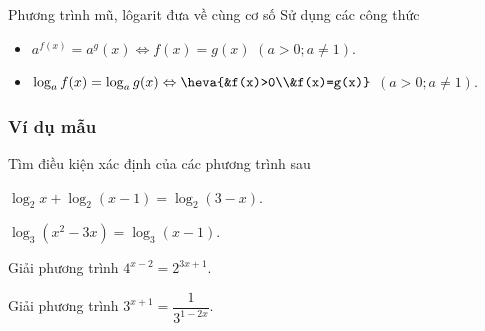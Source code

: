 \begin{dang}{Phương trình mũ, lôgarit đưa về cùng cơ số}
	Sử dụng các công thức
	\begin{itemize}
		\item $a^{f(x)}=a^g(x) \Leftrightarrow f(x)=g(x)$ $(a>0; a\neq 1)$.
		\item $\log_a f(x)=\log_a g(x)\Leftrightarrow \heva{&f(x)>0\\&f(x)=g(x)}$ $(a>0;a\neq 1)$.
	\end{itemize}
\end{dang}
\subsubsection{Ví dụ mẫu}
\begin{vd}%
	Tìm điều kiện xác định của các phương trình sau
	\begin{listEX}[2]
		\item $\log_2x+\log_2(x-1)=\log_2(3-x)$.
		\item $\log_3(x^2-3x)=\log_3(x-1)$.
	\end{listEX}
\end{vd}

\begin{vd} %
	Giải phương trình $4^{x-2}=2^{3x+1}$.
\end{vd}

\begin{vd} %
	Giải phương trình $3^{x+1}=\dfrac{1}{3^{1-2x}}$.
\end{vd}

